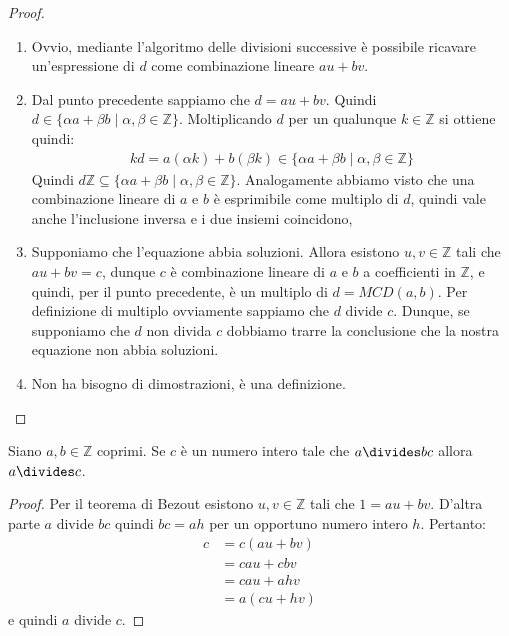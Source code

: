 \begin{proof}
\begin{enumerate}
	\item Ovvio, mediante l'algoritmo delle divisioni successive è possibile ricavare un'espressione di $d$ come combinazione lineare $au+bv$.
	\item Dal punto precedente sappiamo che $d=au+bv$. Quindi $d \in \{\alpha a + \beta b \; | \; \alpha, \beta \in \mathbb{Z}\}$. Moltiplicando $d$ per un qualunque $k \in \mathbb{Z}$ si ottiene quindi:
	\begin{align*}
		kd = a (\alpha k) + b (\beta k) \in \{\alpha a + \beta b \; | \; \alpha, \beta \in \mathbb{Z}\}
	\end{align*}
Quindi $d\mathbb{Z} \subseteq \{\alpha a + \beta b \; | \; \alpha, \beta \in \mathbb{Z}\}$. Analogamente abbiamo visto che una combinazione lineare di $a$ e $b$ è esprimibile come multiplo di $d$, quindi vale anche l'inclusione inversa e i due insiemi coincidono,
\item Supponiamo che l'equazione abbia soluzioni. Allora esistono $u,v \in \mathbb{Z}$ tali che $au+bv=c$, dunque $c$ è combinazione lineare di $a$ e $b$ a coefficienti in $\mathbb{Z}$, e quindi, per il punto precedente, è un multiplo di $d=MCD(a,b)$. Per definizione di multiplo ovviamente sappiamo che $d$ divide $c$. Dunque, se supponiamo che $d$ non divida $c$ dobbiamo trarre la conclusione che la nostra equazione non abbia soluzioni.
\item Non ha bisogno di dimostrazioni, è una definizione.
\end{enumerate}	
\end{proof}
\begin{lemmabox}[di Euclide]\label{lemma:euclide}
	Siano $a,b \in \mathbb{Z}$ coprimi. Se $c$ è un numero intero tale che $a \divides bc$ allora $a \divides c$.
\end{lemmabox}

\begin{proof}
	Per il teorema di Bezout esistono $u,v \in \mathbb{Z}$ tali che $1=au+bv$. D'altra parte $a$ divide $bc$ quindi $bc=ah$ per un opportuno numero intero $h$. Pertanto:
	\begin{align*}
		c &= c(au+bv) \\
		&= cau+cbv \\
		&= cau +ahv \\
		&= a(cu+hv)
	\end{align*}
	e quindi $a$ divide $c$.
\end{proof} 

